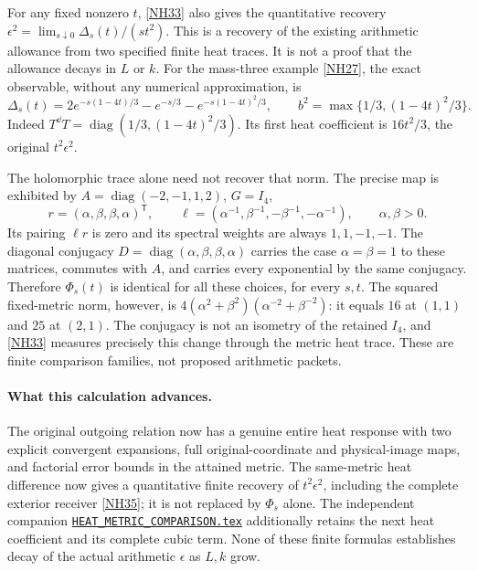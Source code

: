 \documentclass[11pt]{article}
\newcommand{\eps}{\epsilon}\newcommand{\spec}{\operatorname{spec}}
\begin{document}
For any fixed nonzero \(t\), \eqref{NH33} also gives
the quantitative recovery
\(\eps^2=\lim_{s\downarrow0}\Delta_s(t)/(st^2)\).
This is a recovery of the existing arithmetic allowance
from two specified finite heat traces. It is not a
proof that the allowance decays in \(L\) or \(k\).
For the mass-three example \eqref{NH27}, the exact
observable, without any numerical approximation, is
\begin{equation}\tag{NH36}\label{NH36}
\Delta_s(t)=
2e^{-s(1-4t)/3}-e^{-s/3}
-e^{-s(1-4t)^2/3},\qquad
b^2=\max\{1/3,(1-4t)^2/3\}.
\end{equation}
Indeed \(T^\dd T=\operatorname{diag}(1/3,(1-4t)^2/3)\).
Its first heat coefficient is \(16t^2/3\), the
original \(t^2\eps^2\).

The holomorphic trace alone need not recover that norm.
The precise map is exhibited by
\(A=\operatorname{diag}(-2,-1,1,2)\), \(G=I_4\),
\[
r=(\alpha,\beta,\beta,\alpha)^{\mathsf T},\qquad
\ell=(\alpha^{-1},\beta^{-1},-\beta^{-1},-\alpha^{-1}),
\qquad \alpha,\beta>0.
\]
Its pairing \(\ell r\) is zero and its spectral weights
are always \(1,1,-1,-1\).
The diagonal conjugacy
\(D=\operatorname{diag}(\alpha,\beta,\beta,\alpha)\)
carries the case \(\alpha=\beta=1\) to these matrices,
commutes with \(A\), and carries every exponential by
the same conjugacy. Therefore \(\Phi_s(t)\) is identical
for all these choices, for every \(s,t\).
The squared fixed-metric norm, however, is
\(4(\alpha^2+\beta^2)(\alpha^{-2}+\beta^{-2})\):
it equals \(16\) at \((1,1)\) and \(25\) at \((2,1)\).
The conjugacy is not an isometry of the retained
\(I_4\), and \eqref{NH33} measures precisely this
change through the metric heat trace.
These are finite comparison families, not proposed
arithmetic packets.

\paragraph{What this calculation advances.}
The original outgoing relation now has a genuine entire
heat response with two explicit convergent expansions,
full original-coordinate and physical-image maps, and
factorial error bounds in the attained metric.
The same-metric heat difference now gives a quantitative
finite recovery of \(t^2\eps^2\), including the complete
exterior receiver \eqref{NH35}; it is not replaced by
\(\Phi_s\) alone. The independent companion
\href{https://github.com/KokunoYumeto/zeta-function-research-reader/blob/5992ad50c0f2a06921f1fcaded7b4e38097c0739/workbenches/splitzero-tandem/continuations/20260920-original-kernel-mixed-determinants/providers/HEAT_METRIC_COMPARISON.tex\#L1}{\texttt{HEAT\_METRIC\_COMPARISON.tex}} additionally retains
the next heat coefficient and its complete cubic term.
None of these finite formulas establishes decay of the
actual arithmetic \(\eps\) as \(L,k\) grow.
\end{document}
